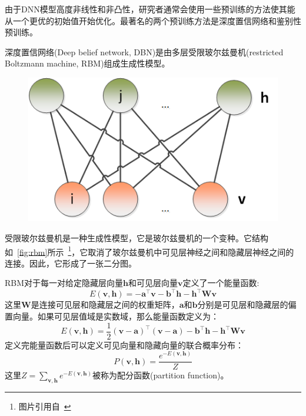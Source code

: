 由于DNN模型高度非线性和非凸性，研究者通常会使用一些预训练的方法使其能从一个更优的初始值开始优化。最著名的两个预训练方法是深度置信网络和鉴别性预训练。

深度置信网络(Deep belief network, DBN)是由多层受限玻尔兹曼机(restricted Boltzmann machine, RBM)组成生成性模型。

\begin{figure}[!htp]
  \centering
    \captionstyle{\centering}
    \includegraphics[width=.5\textwidth]{figure/RBM.png}
\end{figure}

受限玻尔兹曼机是一种生成性模型，它是玻尔兹曼机的一个变种。它结构如~\ref{fig:rbm}所示~\footnote{图片引用自~\cite{ASRBook-Yu2014}}，它取消了玻尔兹曼机中可见层神经之间和隐藏层神经之间的连接。因此，它形成了一张二分图。

RBM对于每一对给定隐藏层向量$\mathbf{h}$和可见层向量$\mathbf{v}$定义了一个能量函数:
\begin{equation}
    E(\mathbf{v}, \mathbf{h}) = -\mathbf{a}^{\top} \mathbf{v} - \mathbf{b}^{\top} \mathbf{h} - \mathbf{h}^{\top} \mathbf{W} \mathbf{v}
\end{equation}
这里$\mathbf{W}$是连接可见层和隐藏层之间的权重矩阵，$\mathbf{a}$和$\mathbf{b}$分别是可见层和隐藏层的偏置向量。如果可见层值域是实数域，那么能量函数定义为：
\begin{equation}
    E(\mathbf{v}, \mathbf{h}) = \frac{1}{2}(\mathbf{v}-\mathbf{a})^{\top} (\mathbf{v} - \mathbf{a}) - \mathbf{b}^{\top} \mathbf{h} - \mathbf{h}^{\top} \mathbf{W} \mathbf{v}
\end{equation}
定义完能量函数后可以定义可见向量和隐藏向量的联合概率分布：
\begin{equation}
    P(\mathbf{v}, \mathbf{h}) = \frac{e^{-E(\mathbf{v}, \mathbf{h})}}{Z}
\end{equation}
这里$Z=\sum_{\mathbf{v},\mathbf{h}} e^{-E(\mathbf{v}, \mathbf{h})}$被称为配分函数(partition function)。

